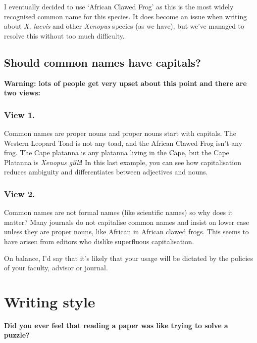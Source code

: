 \documentclass[
]{krantz}
\begin{document}
I eventually decided to use `African Clawed Frog' as this is the most widely recognised common name for this species. It does become an issue when writing about \emph{X. laevis} and other \emph{Xenopus} species (as we have), but we've managed to resolve this without too much difficulty.

\hypertarget{should-common-names-have-capitals}{%
\subsection{Should common names have capitals?}\label{should-common-names-have-capitals}}

\textbf{Warning: lots of people get very upset about this point and there are two views:}

\hypertarget{view-1.}{%
\subsubsection{View 1.}\label{view-1.}}

Common names are proper nouns and proper nouns start with capitals. The Western Leopard Toad is not any toad, and the African Clawed Frog isn't any frog. The Cape platanna is any platanna living in the Cape, but the Cape Platanna is \emph{Xenopus gilli}! In this last example, you can see how capitalisation reduces ambiguity and differentiates between adjectives and nouns.

\hypertarget{view-2.}{%
\subsubsection{View 2.}\label{view-2.}}

Common names are not formal names (like scientific names) so why does it matter? Many journals do not capitalise common names and insist on lower case unless they are proper nouns, like African in African clawed frogs. This seems to have arisen from editors who dislike superfluous capitalisation.

On balance, I'd say that it's likely that your usage will be dictated by the policies of your faculty, advisor or journal.

\hypertarget{style}{%
\section{Writing style}\label{style}}

\textbf{Did you ever feel that reading a paper was like trying to solve a puzzle?}
\end{document}
